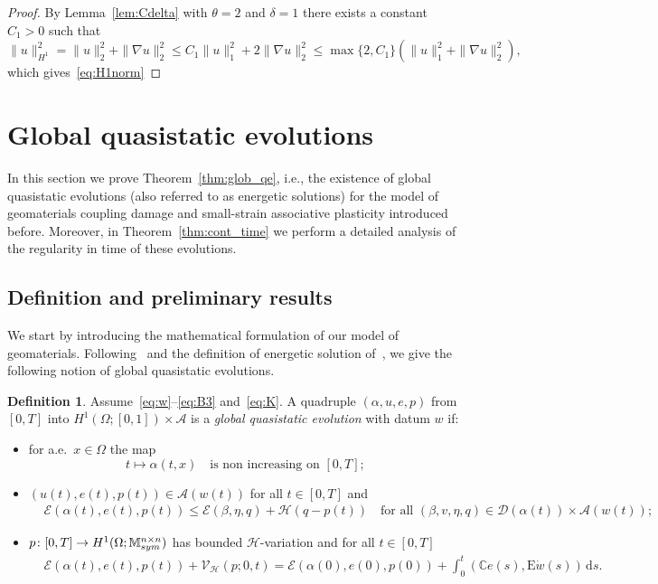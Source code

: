 \documentclass[reqno]{amsart}
\theoremstyle{definition}
\newtheorem{definition}[corollary]{Definition}
\numberwithin{equation}{section}
\def\de {\mathrm{d}}
\def\M {\mathbb M^{n\times n}_{\rm sym}}
\def\C {\mathbb C}
\def\EE {\mathrm{E}}
\begin{document}
\begin{proof}
By Lemma~\ref{lem:Cdelta} with $\theta=2$ and $\delta=1$ there exists a constant $C_1>0$ such that 
$$\|u\|_{H^1}^2=\|u\|_2^2+\|\nabla u\|_2^2\le C_1\|u\|_1^2+2\|\nabla u\|_2^2\le \max\{2,C_1\}\left(\|u\|_1^2+\|\nabla u\|_2^2\right),$$
which gives~\eqref{eq:H1norm}
\end{proof}


\section{Global quasistatic evolutions}\label{sec:gl_qe}

In this section we prove Theorem~\ref{thm:glob_qe}, i.e., the existence of global quasistatic evolutions (also referred to as energetic solutions) for the model of geomaterials coupling damage and small-strain associative plasticity introduced before. Moreover, in Theorem~\ref{thm:cont_time} we perform a detailed analysis of the regularity in time of these evolutions.

\subsection{Definition and preliminary results}

We start by introducing the mathematical formulation of our model of geomaterials. Following~\cite{Cr3} and the definition of energetic solution of~\cite{MieThe99MMRI}, we give the following notion of global quasistatic evolutions.

\begin{definition}\label{def:QSE}
Assume~\eqref{eq:w}--\eqref{eq:B3} and~\eqref{eq:K}. A quadruple $(\alpha,u,e,p)$ from $[0,T]$ into $H^1(\Omega;[0,1])\times\mathcal A$ is a {\it global quasistatic evolution} with datum $w$ if:
\begin{itemize}
    \item[(qs0)] for a.e.\ $x\in\Omega$ the map
    \begin{equation*}
t\mapsto \alpha(t,x)\quad\text{is non increasing on $[0,T]$}; 
\end{equation*}
    \item[(qs1)] $(u(t),e(t),p(t))\in\mathcal A(w(t))$ for all $t\in[0,T]$ and
    \begin{align*}
     &\mathcal E(\alpha(t),e(t),p(t))\le \mathcal E(\beta,\eta,q)+\mathcal H(q-p(t))\quad\text{for all $(\beta,v,\eta,q)\in \mathcal D(\alpha(t))\times \mathcal A(w(t))$;}
    \end{align*}
    \item[(qs2)] $p\colon [0,T]\to H^1(\Omega;\M)$ has bounded $\mathcal H$-variation and for all $t\in[0,T]$
  \begin{align*}
      &\mathcal E(\alpha(t),e(t),p(t))+\mathcal V_{\mathcal H}(p;0,t)= \mathcal E(\alpha(0),e(0),p(0))+\int_0^t(\C e(s),\EE \dot w(s))\,\de s.
  \end{align*}
\end{itemize}
\end{definition}
\end{document}

